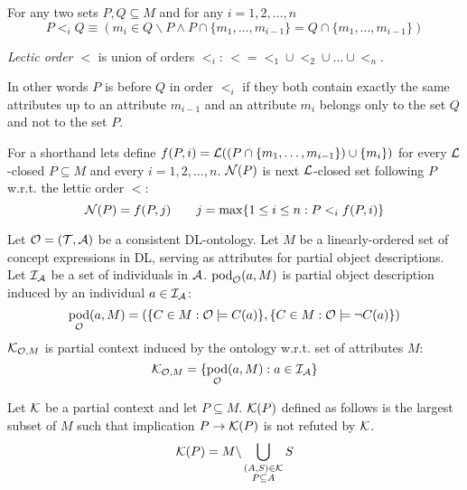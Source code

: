 \documentclass{llncs}
\newcommand{\pc}{\ensuremath\mathcal{K}}
\newcommand{\soi}{\ensuremath\mathcal{L}}
\newcommand{\next}{\ensuremath\mathcal{N}}
\newcommand{\ont}{\ensuremath\mathcal{O}}
\newcommand{\tbox}{\ensuremath\mathcal{T}}
\newcommand{\abox}{\ensuremath\mathcal{A}}
\newcommand{\ind}{\ensuremath\mathcal{I}}
\DeclareMathOperator{\POD}{pod}
\begin{document}
\begin{definition}
For any two sets $P,Q\subseteq M$ and for any $i=1,2,\ldots,n$
\[P<_i Q \equiv \left(m_i\in Q\backslash P \land P\cap \{m_1,\ldots,m_{i-1}\}=Q\cap \{m_1,\ldots,m_{i-1}\} \right) \]

\emph{Lectic order $<$} is union of orders $<_i$: $<=<_1 \cup <_2 \cup \ldots \cup <_n$.
\end{definition}
In other words $P$ is before $Q$ in order $<_i$ if they both contain exactly the same attributes up to an attribute $m_{i-1}$ and an attribute $m_i$ belongs only to the set $Q$ and not to the set $P$.

\begin{definition}
For a shorthand lets define $f(P,i)=\soi((P\cap \{m_1,\ldots,m_{i-1}\})\cup\{m_i\})$ for every $\soi$-closed $P\subseteq M$ and every $i=1,2,\ldots,n$. 
$\next(P)$ is next $\soi$-closed set following $P$ w.r.t. the lettic order $<$: 
\[\next(P)=f(P,j) \qquad j=\max\{1\leq i\leq n: P<_i f(P,i)\} \]
\end{definition}

Let $\ont=(\tbox,\abox)$ be a consistent DL-ontology. Let $M$ be a linearly-ordered
set of concept expressions in DL, serving as attributes for partial object
descriptions. Let $\ind_\abox$ be a set of individuals in $\abox$.
$\POD_\ont(a,M)$ is partial object description induced by an individual
$a\in\ind_\abox$:
\[ \POD_\ont(a,M)=\left(\{C\in M: \ont\models C(a)\}, \{C\in M: \ont\models \lnot C(a)\}\right) \]
$\pc_{\ont,M}$ is partial context induced by the ontology w.r.t. set of attributes $M$:
\[ \pc_{\ont,M}=\{\POD_\ont(a,M): a\in\ind_\abox \} \]

\begin{definition}
Let $\pc$ be a partial context and let $P\subseteq M$. 
$\pc(P)$ defined as follows is the largest subset of $M$ such that implication $P\to \pc(P)$ is not refuted by $\pc$.
\[ \pc(P)=M\backslash \bigcup_{\substack{(A,S)\in\pc\\P\subseteq A}} S \]
\end{definition}
\end{document}
